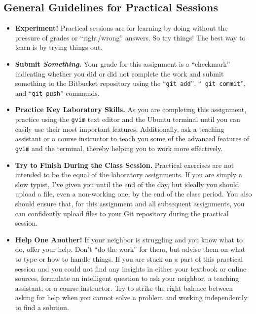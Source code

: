 \subsection*{General Guidelines for Practical Sessions}
\vspace*{-.05in}
\begin{itemize}

\item {\bf Experiment!} Practical sessions are for learning by doing without the pressure of grades or ``right/wrong''
  answers. So try things!  The best way to learn is by trying things out.

\item {\bf Submit \textbf{\textit{Something}}.} Your grade for this assignment is a ``checkmark'' indicating whether you
  did or did not complete the work and submit something to the Bitbucket repository using the ``{\tt git add}'', ``{\tt
    git commit}'', and ``{\tt git push}'' commands.

\item {\bf Practice Key Laboratory Skills.} As you are completing this assignment, practice using the {\tt {\tt gvim}} text
  editor and the Ubuntu terminal until you can easily use their most important features.  Additionally, ask
  a teaching assistant or a course instructor to teach you some of the advanced features of {\tt {\tt gvim}} and the
  terminal, thereby helping you to work more effectively. 

\item {\bf Try to Finish During the Class Session.} Practical exercises are not intended to be the equal of the
  laboratory assignments. If you are simply a slow typist, I've given you until the end of the day, but ideally you
  should upload a file, even a non-working one, by the end of the class period. You also should ensure that, for this
  assignment and all subsequent assignments, you can confidently upload files to your Git repository during the
  practical session.

\item {\bf Help One Another!} If your neighbor is struggling and you know what to do, offer your help. Don't ``do the
  work'' for them, but advise them on what to type or how to handle things. If you are stuck on a part of this practical
  session and you could not find any insights in either your textbook or online sources, formulate an intelligent
  question to ask your neighbor, a teaching assistant, or a course instructor. Try to strike the right balance between
  asking for help when you cannot solve a problem and working independently to find a solution.


\end{itemize}
